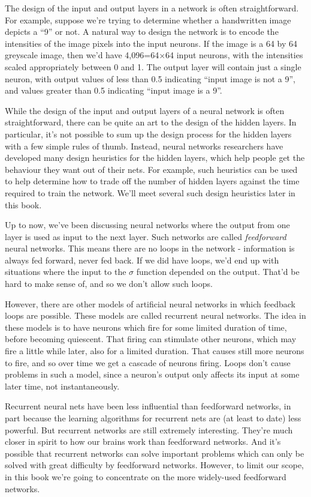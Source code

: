 The design of the input and output layers in a network is often straightforward. For example, suppose we're trying to determine whether a handwritten image depicts a ``9'' or not. A natural way to design the network is to encode the intensities of the image pixels into the input neurons. If the image is a 64 by 64 greyscale image, then we'd have 4,096=64$\times$64 input neurons, with the intensities scaled appropriately between 0 and 1. The output layer will contain just a single neuron, with output values of less than 0.5 indicating ``input image is not a 9'', and values greater than 0.5 indicating ``input image is a 9''.

While the design of the input and output layers of a neural network is often straightforward, there can be quite an art to the design of the hidden layers. In particular, it's not possible to sum up the design process for the hidden layers with a few simple rules of thumb. Instead, neural networks researchers have developed many design heuristics for the hidden layers, which help people get the behaviour they want out of their nets. For example, such heuristics can be used to help determine how to trade off the number of hidden layers against the time required to train the network. We'll meet several such design heuristics later in this book. 

Up to now, we've been discussing neural networks where the output from one layer is used as input to the next layer. Such networks are called \textit{feedforward} neural networks. This means there are no loops in the network - information is always fed forward, never fed back. If we did have loops, we'd end up with situations where the input to the $\sigma$ function depended on the output. That'd be hard to make sense of, and so we don't allow such loops.

However, there are other models of artificial neural networks in which feedback loops are possible. These models are called recurrent neural networks\cite{WikiPediaRNN2019}. The idea in these models is to have neurons which fire for some limited duration of time, before becoming quiescent. That firing can stimulate other neurons, which may fire a little while later, also for a limited duration. That causes still more neurons to fire, and so over time we get a cascade of neurons firing. Loops don't cause problems in such a model, since a neuron's output only affects its input at some later time, not instantaneously.

Recurrent neural nets have been less influential than feedforward networks, in part because the learning algorithms for recurrent nets are (at least to date) less powerful. But recurrent networks are still extremely interesting. They're much closer in spirit to how our brains work than feedforward networks. And it's possible that recurrent networks can solve important problems which can only be solved with great difficulty by feedforward networks. However, to limit our scope, in this book we're going to concentrate on the more widely-used feedforward networks.

